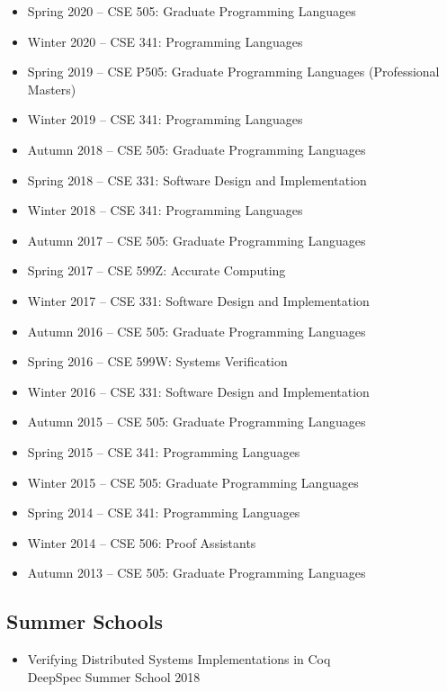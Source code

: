 \documentclass[10pt]{article}
\begin{document}
\begin{itemize}
  \item Spring 2020 -- CSE 505: Graduate Programming Languages
  \item Winter 2020 -- CSE 341: Programming Languages
  \item Spring 2019 -- CSE P505: Graduate Programming Languages (Professional Masters)
  \item Winter 2019 -- CSE 341: Programming Languages
  \item Autumn 2018 -- CSE 505: Graduate Programming Languages
  \item Spring 2018 -- CSE 331: Software Design and Implementation
  \item Winter 2018 -- CSE 341: Programming Languages
  \item Autumn 2017 -- CSE 505: Graduate Programming Languages
  \item Spring 2017 -- CSE 599Z: Accurate Computing
  \item Winter 2017 -- CSE 331: Software Design and Implementation
  \item Autumn 2016 -- CSE 505: Graduate Programming Languages
  \item Spring 2016 -- CSE 599W: Systems Verification
  \item Winter 2016 -- CSE 331: Software Design and Implementation
  \item Autumn 2015 -- CSE 505: Graduate Programming Languages
  \item Spring 2015 -- CSE 341: Programming Languages
  \item Winter 2015 -- CSE 505: Graduate Programming Languages
  \item Spring 2014 -- CSE 341: Programming Languages
  \item Winter 2014 -- CSE 506: Proof Assistants
  \item Autumn 2013 -- CSE 505: Graduate Programming Languages
\end{itemize}

\subsection*{Summer Schools}

\begin{itemize}
  \item Verifying Distributed Systems Implementations in Coq \\
        DeepSpec Summer School 2018
\end{itemize}
\end{document}

